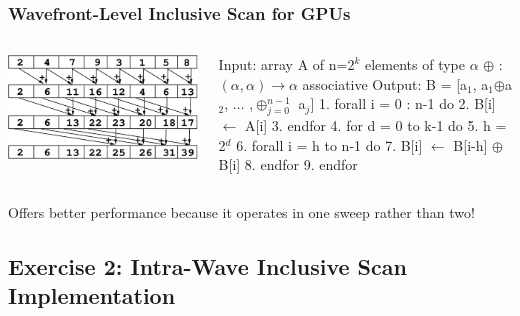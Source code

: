 \documentclass{beamer}
\newcommand{\emp}[1]{\textcolor{DikuRed}{ #1}}
\newcommand{\mymath}[1]{$ #1 $}
\newcommand{\myindx}[1]{_{#1}}
\newcommand{\myindu}[1]{^{#1}}
\begin{document}
\begin{frame}[fragile,t]
  \frametitle{Wavefront-Level Inclusive Scan for GPUs}

\begin{columns}
\includegraphics[height=15ex]{img/day3/incScanGPU} 
\begin{colorcode}
Input:  array A of n=\mymath{2\myindu{k}} elements
                       of type \mymath{\alpha}
        \mymath{\oplus} : \mymath{(\alpha,\alpha)\to\alpha} associative
Output: B = [a\mymath{\myindx{1}}, a\mymath{\myindx{1}}\mymath{\oplus}a\mymath{\myindx{2}}, \mymath{\ldots} ,\mymath{\oplus\myindx{j=0}\myindu{n-1}} a\mymath{\myindx{j}}]
1.  forall i = 0 : n-1 do
2.    B[i] \mymath{\leftarrow} A[i]
3.  endfor
4.  for d = 0 to k-1 do
5.    h = 2\mymath{\myindu{d}}
6.    forall i = h to n-1 do 
7.      B[i] \mymath{\leftarrow} B[i-h] \mymath{\oplus} B[i]
8.    endfor
9.  endfor
\end{colorcode}
\end{columns}\bigskip

\emp{Offers better performance because it operates in one sweep rather than two!}

\end{frame}

\subsection{Exercise 2: Intra-Wave Inclusive Scan Implementation}
\end{document}
